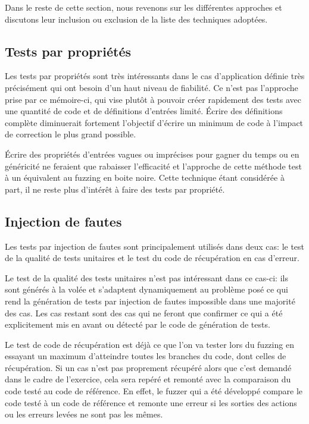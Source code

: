 \documentclass[a4paper]{report}
\begin{document}
Dans le reste de cette section, nous revenons sur les différentes approches et discutons leur inclusion ou exclusion de la liste des techniques adoptées.


\subsection{Tests par propriétés}

Les tests par propriétés sont très intéressants dans le cas d'application définie très précisément qui ont besoin d'un haut niveau de fiabilité.
Ce n'est pas l'approche prise par ce mémoire-ci, qui vise plutôt à pouvoir créer rapidement des tests avec une quantité de code et de définitions d'entrées limité.
Écrire des définitions complète diminuerait fortement l'objectif d'écrire un minimum de code à l'impact de correction le plus grand possible.

Écrire des propriétés d'entrées vagues ou imprécises pour gagner du temps ou en généricité ne feraient que rabaisser l'efficacité et l'approche de cette méthode test à un équivalent au fuzzing en boite noire.
Cette technique étant considérée à part, il ne reste plus d'intérêt à faire des tests par propriété. 

\subsection{Injection de fautes}

Les tests par injection de fautes sont principalement utilisés dans deux cas: le test de la qualité de tests unitaires et le test du code de récupération en cas d'erreur.

Le test de la qualité des tests unitaires n'est pas intéressant dans ce cas-ci: ils sont générés à la volée et s'adaptent dynamiquement au problème posé ce qui rend la génération de tests par injection de fautes impossible dans une majorité des cas.
Les cas restant sont des cas qui ne feront que confirmer ce qui a été explicitement mis en avant ou détecté par le code de génération de tests.

Le test de code de récupération est déjà ce que l'on va tester lors du fuzzing en essayant un maximum d'atteindre toutes les branches du code, dont celles de récupération.
Si un cas n'est pas proprement récupéré alors que c'est demandé dans le cadre de l'exercice, cela sera repéré et remonté avec la comparaison du code testé au code de référence.
En effet, le fuzzer qui a été développé compare le code testé à un code de référence et remonte une erreur si les sorties des actions ou les erreurs levées ne sont pas les mêmes.
\end{document}
